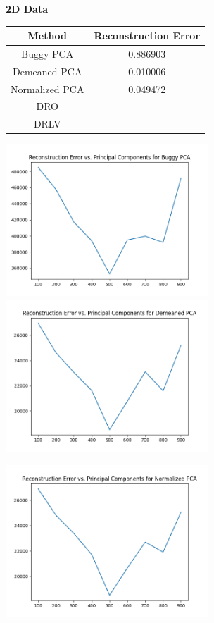 \begin{itemize}
\begin{soln}
  \begin{center}
    \textbf{2D Data} \\
    \begin{tabular}{ c  c }
      \hline
      Method & Reconstruction Error \\ \hline
      Buggy PCA & 0.886903 \\
      Demeaned PCA & 0.010006 \\
      Normalized PCA & 0.049472 \\
      DRO & \\
      DRLV & \\
      \hline
    \end{tabular}
  \end{center}

  \includegraphics[width=3in]{../figs/buggy_error_curve.png} \hspace{0.1in}
  \includegraphics[width=3in]{../figs/demeaned_error_curve.png} \\
  \begin{center}
    \includegraphics[width=3in]{../figs/normalized_error_curve.png}
  \end{center}


\end{soln}
\end{itemize}
